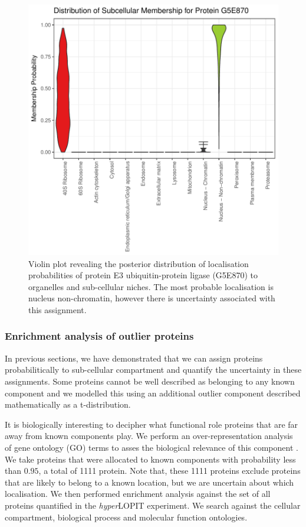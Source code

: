 \documentclass[12pt,english]{article}
\begin{document}
\begin{figure}[ht]
\centering
\includegraphics{tagm-009}

  \caption{Violin plot revealing the posterior distribution of localisation probabilities
         of protein E3 ubiquitin-protein ligase (G5E870) to organelles and sub-cellular niches.
        The most probable localisation is nucleus non-chromatin, however there is uncertainty associated
        with this assignment.}
  \label{fig:G5E870}
\end{figure}

\clearpage
\subsubsection{Enrichment analysis of outlier proteins}
In previous sections, we have demonstrated that we can assign proteins probabilitically to
sub-cellular compartment and quantify the uncertainty in these assignments. Some proteins
cannot be well described as belonging to any known component and we modelled this
using an additional outlier component described mathematically as a t-distribution.

It is biologically interesting to decipher what functional role proteins that
are far away from known components play. We perform an over-representation analysis of
gene ontology (GO) terms to asses the biological relevance of this component \citep{Boyle:2004, Yu:2012}.
We take proteins that were allocated to known components with probability less than $0.95$, a total of 1111 protein.
Note that, these 1111 proteins exclude proteins that are likely to belong to a known location, but we are uncertain
about which localisation.
We then performed enrichment analysis against the set of all proteins quantified in the \textit{hyper}LOPIT experiment. We search
against the cellular compartment, biological process and molecular function ontologies.
\end{document}
